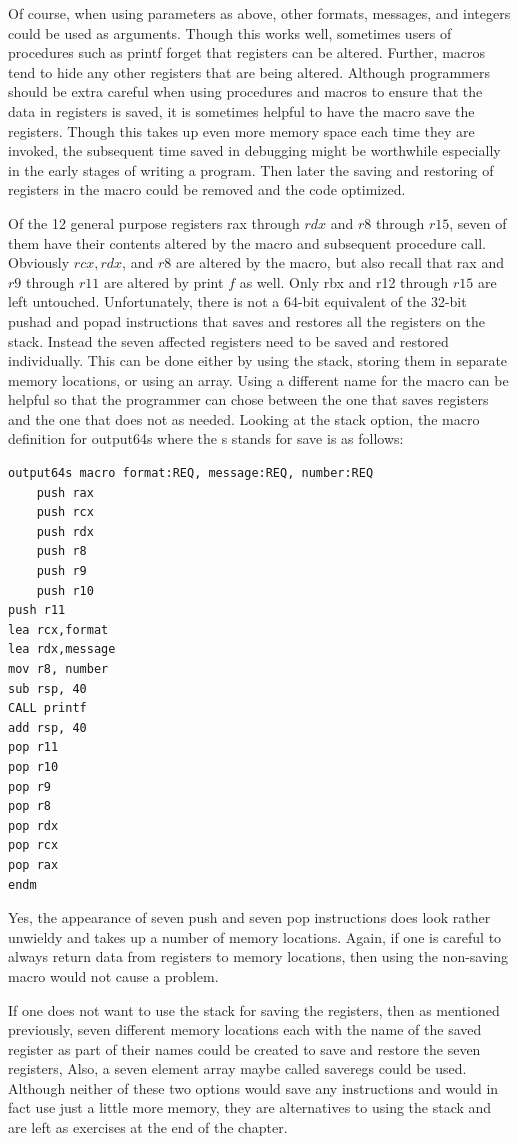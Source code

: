 \documentclass[10pt]{book}
\begin{document}
\begin{center}
\begin{center}
\begin{center}
\begin{center}
Of course, when using parameters as above, other formats, messages, and integers could be used as arguments. Though this works well, sometimes users of procedures such as printf forget that registers can be altered. Further, macros tend to hide any other registers that are being altered. Although programmers should be extra careful when using procedures and macros to ensure that the data in registers is saved, it is sometimes helpful to have the macro save the registers. Though this takes up even more memory space each time they are invoked, the subsequent time saved in debugging might be worthwhile especially in the early stages of writing a program. Then later the saving and restoring of registers in the macro could be removed and the code optimized.

Of the 12 general purpose registers rax through $r d x$ and $r 8$ through $r 15$, seven of them have their contents altered by the macro and subsequent procedure call. Obviously $r c x, r d x$, and $r 8$ are altered by the macro, but also recall that rax and $r 9$ through $r 11$ are altered by print $f$ as well. Only rbx and r12 through $r 15$ are left untouched. Unfortunately, there is not a 64-bit equivalent of the 32-bit pushad and popad instructions that saves and restores all the registers on the stack. Instead the seven affected registers need to be saved and restored individually. This can be done either by using the stack, storing them in separate memory locations, or using an array. Using a different name for the macro can be helpful so that the programmer can chose between the one that saves registers and the one that does not as needed. Looking at the stack option, the macro definition for output64s where the s stands for save is as follows:

\begin{verbatim}
output64s macro format:REQ, message:REQ, number:REQ
    push rax
    push rcx
    push rdx
    push r8
    push r9
    push r10
push r11
lea rcx,format
lea rdx,message
mov r8, number
sub rsp, 40
CALL printf
add rsp, 40
pop r11
pop r10
pop r9
pop r8
pop rdx
pop rcx
pop rax
endm
\end{verbatim}

Yes, the appearance of seven push and seven pop instructions does look rather unwieldy and takes up a number of memory locations. Again, if one is careful to always return data from registers to memory locations, then using the non-saving macro would not cause a problem.


If one does not want to use the stack for saving the registers, then as mentioned previously, seven different memory locations each with the name of the saved register as part of their names could be created to save and restore the seven registers, Also, a seven element array maybe called saveregs could be used. Although neither of these two options would save any instructions and would in fact use just a little more memory, they are alternatives to using the stack and are left as exercises at the end of the chapter.


\end{center}
\end{center}
\end{center}
\end{center}
\end{document}
